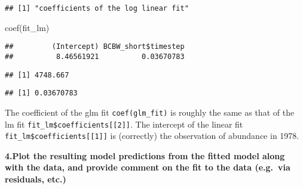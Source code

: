 \documentclass[
]{article}
\newenvironment{Shaded}{\begin{snugshade}}{\end{snugshade}}
\newcommand{\CommentTok}[1]{\textcolor[rgb]{0.56,0.35,0.01}{\textit{#1}}}
\newcommand{\DecValTok}[1]{\textcolor[rgb]{0.00,0.00,0.81}{#1}}
\newcommand{\FunctionTok}[1]{\textcolor[rgb]{0.00,0.00,0.00}{#1}}
\newcommand{\NormalTok}[1]{#1}
\newcommand{\SpecialCharTok}[1]{\textcolor[rgb]{0.00,0.00,0.00}{#1}}
\begin{document}
\begin{verbatim}
## [1] "coefficients of the log linear fit"
\end{verbatim}

\begin{Shaded}
\begin{Highlighting}[]
\FunctionTok{coef}\NormalTok{(fit\_lm)}
\end{Highlighting}
\end{Shaded}

\begin{verbatim}
##         (Intercept) BCBW_short$timestep 
##          8.46561921          0.03670783
\end{verbatim}

\begin{Shaded}
\end{Shaded}

\begin{verbatim}
## [1] 4748.667
\end{verbatim}

\begin{Shaded}
\end{Shaded}

\begin{verbatim}
## [1] 0.03670783
\end{verbatim}

The coefficient of the glm fit \texttt{coef(glm\_fit)} is roughly the
same as that of the lm fit \texttt{fit\_lm\$coefficients{[}{[}2{]}{]}}.
The intercept of the linear fit
\texttt{fit\_lm\$coefficients{[}{[}1{]}{]}} is (correctly) the
observation of abundance in 1978.

\textbf{4.Plot the resulting model predictions from the fitted model
along with the data, and provide comment on the fit to the data
(e.g.~via residuals, etc.)}
\end{document}
